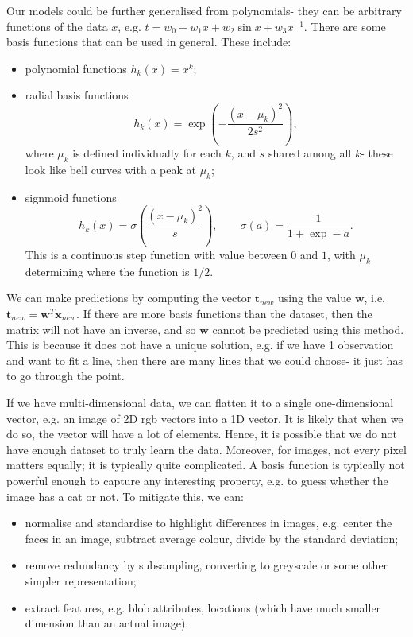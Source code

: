 \documentclass[a4paper, openany]{memoir}
\begin{document}
    Our models could be further generalised from polynomials- they can be arbitrary functions of the data $x$, e.g. $t = w_0 + w_1x + w_2 \sin x + w_3 x^{-1}$. There are some basis functions that can be used in general. These include:
    \begin{itemize}
        \item polynomial functions $h_k(x) = x^k$;
        \item radial basis functions
        \[h_k(x) = \exp \left(-\frac{(x - \mu_k)^2}{2s^2}\right),\]
        where $\mu_k$ is defined individually for each $k$, and $s$ shared among all $k$- these look like bell curves with a peak at $\mu_k$;
        \item signmoid functions
        \[h_k(x) = \sigma \left(\frac{(x - \mu_k)^2}{s}\right), \qquad \sigma(a) = \frac{1}{1 + \exp -a}.\]
        This is a continuous step function with value between 0 and $1$, with $\mu_k$ determining where the function is $1/2$.
    \end{itemize}
    We can make predictions by computing the vector $\mathbf{t}_{new}$ using the value $\mathbf{w}$, i.e. $\mathbf{t}_{new} = \mathbf{w}^T \mathbf{x}_{new}$. If there are more basis functions than the dataset, then the matrix will not have an inverse, and so $\mathbf{w}$ cannot be predicted using this method. This is because it does not have a unique solution, e.g. if we have 1 observation and want to fit a line, then there are many lines that we could choose- it just has to go through the point.

    If we have multi-dimensional data, we can flatten it to a single one-dimensional vector, e.g. an image of 2D rgb vectors into a 1D vector. It is likely that when we do so, the vector will have a lot of elements. Hence, it is possible that we do not have enough dataset to truly learn the data. Moreover, for images, not every pixel matters equally; it is typically quite complicated. A basis function is typically not powerful enough to capture any interesting property, e.g. to guess whether the image has a cat or not. To mitigate this, we can:
    \begin{itemize}
        \item normalise and standardise to highlight differences in images, e.g. center the faces in an image, subtract average colour, divide by the standard deviation;
        \item remove redundancy by subsampling, converting to greyscale or some other simpler representation;
        \item extract features, e.g. blob attributes, locations (which have much smaller dimension than an actual image).
    \end{itemize}
\end{document}
